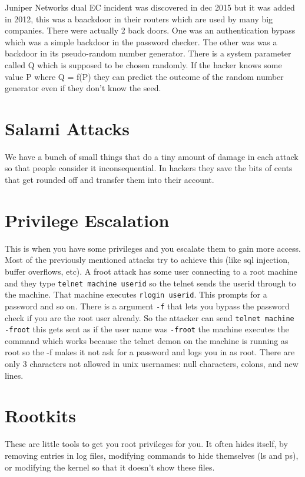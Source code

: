 \documentclass{article}
\begin{document}
Juniper Networks dual EC incident was discovered in dec 2015 but it was added in 2012, this was a baackdoor in their routers which are used by many big companies. There were actually 2 back doors. One was an authentication bypass which was a simple backdoor in the password checker. The other was was a backdoor in its pseudo-random number generator. There is a system parameter called Q which is supposed to be chosen randomly. If the hacker knows some value P where Q = f(P) they can predict the outcome of the random number generator even if they don't know the seed. 


\section{Salami Attacks} %
\label{sec:salami_attacks}
We have a bunch of small things that do a tiny amount of damage in each attack so that people consider it inconsequential. In hackers they save the bits of cents that get rounded off and transfer them into their account. 


\section{Privilege Escalation} %
\label{sec:privilege_escalation}
This is when you have some privileges and you escalate them to gain more access. Most of the previously mentioned attacks try to achieve this (like sql injection, buffer overflows, etc). A froot attack has some user connecting to a root machine and they type \texttt{telnet machine userid} so the telnet sends the userid through to the machine. That machine executes \texttt{rlogin userid}. This prompts for a password and so on. There is a argument \texttt{-f} that lets you bypass the password check if you are the root user already. So the attacker can send \texttt{telnet machine -froot} this gets sent as if the user name was \texttt{-froot} the machine executes the command which works because the telnet demon on the machine is running as root so the -f makes it not ask for a password and logs you in as root. There are only 3 characters not allowed in unix usernames: null characters, colons, and new lines.


\section{Rootkits} %
\label{sec:rootkits}
These are little tools to get you root privileges for you. It often hides itself, by removing entries in log files, modifying commands to hide themselves (ls and ps), or modifying the kernel so that it doesn't show these files. 
\end{document}
